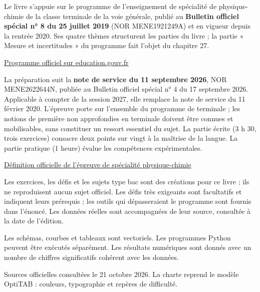 \thispagestyle{otFront}
\label{references}
\fontsize{10.5}{14.5}\selectfont
{}
Le livre s'appuie sur le programme de l'enseignement de spécialité de physique-chimie de la
classe terminale de la voie générale, publié au \textbf{Bulletin officiel spécial n° 8 du
25 juillet 2019} (NOR MENE1921249A) et en vigueur depuis la rentrée 2020. Ses quatre thèmes
structurent les parties du livre ; la partie « Mesure et incertitudes » du programme fait
l'objet du chapitre 27.\par\vspace{3mm}
\href{https://www.education.gouv.fr/bo/19/Special8/MENE1921249A.htm}{\textcolor{otNavy}{Programme officiel sur education.gouv.fr}}\par\vspace{5mm}
La préparation suit la \textbf{note de service du 11 septembre 2026}, NOR MENE2622644N,
publiée au Bulletin officiel spécial n° 4 du 17 septembre 2026. Applicable à compter de la
session 2027, elle remplace la note de service du 11 février 2020. L'épreuve porte sur
l'ensemble du programme de terminale ; les notions de première non approfondies en terminale
doivent être connues et mobilisables, sans constituer un ressort essentiel du sujet.
La partie écrite (3 h 30, trois exercices) consacre deux points sur vingt à la maîtrise de la
langue. La partie pratique (1 heure) évalue les compétences expérimentales.\par\vspace{3mm}
\href{https://www.education.gouv.fr/bo/2026/Special4/MENE2622644N}{\textcolor{otNavy}{Définition officielle de l'épreuve de spécialité physique-chimie}}\par\vspace{5mm}
Les exercices, les défis et les sujets type bac sont des créations pour ce livre ; ils ne
reproduisent aucun sujet officiel. Les défis très exigeants sont facultatifs et indiquent
leurs prérequis ; les outils qui dépasseraient le programme sont fournis dans l'énoncé.
Les données réelles sont accompagnées de leur source, consultée à la date de l'édition.\par\vspace{3mm}
Les schémas, courbes et tableaux sont vectoriels. Les programmes Python peuvent être exécutés
séparément. Les résultats numériques sont donnés avec un nombre de chiffres significatifs
cohérent avec les données.\par\vspace{5mm}
{\fontsize{9}{12}\selectfont\color{otMuted}Sources officielles consultées le 21 octobre 2026.
La charte reprend le modèle OptiTAB : couleurs, typographie et repères de difficulté.}
\clearpage
